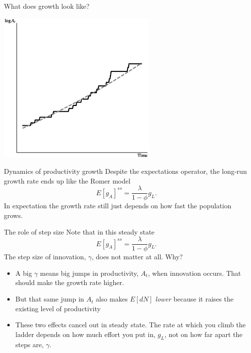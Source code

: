 \begin{frame}{What does growth look like?}
\begin{center}
\includegraphics[height = 3in]{../Figures/fig-ch6-fig1.eps}
\end{center}
\end{frame}

\begin{frame}{Dynamics of productivity growth}
Despite the expectations operator, the long-run growth rate ends up like the Romer model
\begin{equation}
	E[g_A]^{ss} = \frac{\lambda}{1-\phi}g_L. \nonumber
\end{equation}
In expectation the growth rate still just depends on how fast the population grows. 
\end{frame}

\begin{frame}{The role of step size}
Note that in this steady state
\begin{equation}
	E[g_A]^{ss} = \frac{\lambda}{1-\phi}g_L. \nonumber
\end{equation}
The step size of innovation, $\gamma$, does not matter at all. Why?
\begin{itemize}
	\item A big $\gamma$ means big jumps in productivity, $A_t$, when innovation occurs. That should make the growth rate higher.
	\item But that same jump in $A_t$ also makes $E[dN]$ \textit{lower} because it raises the existing level of productivity
	\item These two effects cancel out in steady state. The rate at which you climb the ladder depends on how much effort you put in, $g_L$, not on how far apart the steps are, $\gamma$.
\end{itemize}
\end{frame}

